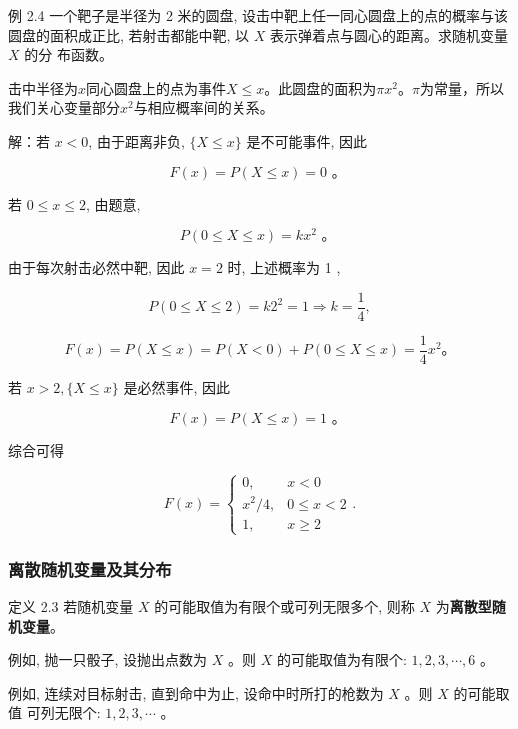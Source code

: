 \documentclass{beamer}
\begin{document}
	\begin{frame}
		例 2.4 一个靶子是半径为 2 米的圆盘, 设击中靶上任一同心圆盘上的点的概率与该 圆盘的面积成正比, 若射击都能中靶, 以 $X$ 表示弹着点与圆心的距离。求随机变量 $X$ 的分 布函数。
	\end{frame}
	
	\begin{frame}
		击中半径为$x$同心圆盘上的点为事件$X \leq x$。此圆盘的面积为$\pi x ^ 2$。$\pi$为常量，所以我们关心变量部分$x ^ 2$与相应概率间的关系。
		
		\vspace*{1cm}
		解：若 $x<0$, 由于距离非负, $\{X \leqslant x\}$ 是不可能事件, 因此
		
		$$
		F(x)=P(X \leqslant x)=0 \text { 。 }
		$$
		
		若 $0 \leqslant x \leqslant 2$, 由题意,
		
		$$
		P(0 \leqslant X \leqslant x)=k x^{2} \text { 。 }
		$$
		
		由于每次射击必然中靶, 因此 $x=2$ 时, 上述概率为 1 ,
		
		$$
		P(0 \leqslant X \leqslant 2)=k 2^{2}=1 \Rightarrow k=\frac{1}{4},
		$$

		$$
		F(x)=P(X \leqslant x)=P(X<0)+P(0 \leqslant X \leqslant x)=\frac{1}{4} x^{2} 。
		$$
	\end{frame}
	
	\begin{frame}
		若 $x>2,\{X \leqslant x\}$ 是必然事件, 因此
		
		$$
		F(x)=P(X \leqslant x)=1 \text { 。 }
		$$
		
		综合可得
		
		$$
		F(x)=\left\{\begin{array}{cc}
			0, & x<0 \\
			x^{2} / 4, & 0 \leqslant x<2 \\
			1, & x \geqslant 2
		\end{array} .\right.
		$$
	\end{frame}
	
	\begin{frame}
		\frametitle{离散随机变量及其分布}
		定义 2.3 若随机变量 $X$ 的可能取值为有限个或可列无限多个, 则称 $X$ 为\textbf{离散型随机变量}。
		
		\vspace*{1cm}
		例如, 抛一只骰子, 设抛出点数为 $X$ 。则 $X$ 的可能取值为有限个: $1,2,3, \cdots, 6$ 。
		
		例如, 连续对目标射击, 直到命中为止, 设命中时所打的枪数为 $X$ 。则 $X$ 的可能取值 可列无限个: $1,2,3, \cdots$ 。
	\end{frame}
	
\end{document}
